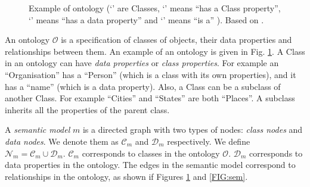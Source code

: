 \documentclass[letterpaper]{article} %
\begin{document}
\begin{figure}[ht]
\caption{Example of ontology
(`' are Classes, `' means ``has a Class property'', 
`' 
means ``has 
a data 
property'' and 
`' means ``is a'' ). Based on 
\cite{Taheriyan2013}.
}
\label{FIG:onto}
\end{figure}




An ontology $\mathcal{O}$ is a specification of classes of objects, their 
data properties and relationships between them. An example of an ontology is 
given 
in Fig. \ref{FIG:onto}. A Class in an ontology can have \emph{data properties} 
or 
\emph{class properties}. For example an ``Organisation'' has a ``Person'' 
(which is a class with its own properties), and it has a ``name'' (which 
is a data property). Also, a Class can be a subclass of another Class. For 
example ``Cities'' and ``States'' are both ``Places''. A subclass 
inherits all the properties of the parent class.

A \emph{semantic model} $m$ is a directed graph with two types of nodes: 
\emph{class nodes} and \emph{data nodes}. We denote them as $\mathcal{C}_m$ and 
$\mathcal{D}_m$ respectively. We define $\mathcal{N}_m = \mathcal{C}_m \cup 
\mathcal{D}_m$. $ \mathcal{C}_m$ corresponds to classes in the ontology 
$\mathcal{O}$. $\mathcal{D}_m$ corresponds to data 
properties in the ontology. The edges in the semantic model correspond to 
relationships in the ontology, as shown if Figures \ref{FIG:onto} and 
\ref{FIG:sem}.
\end{document}
